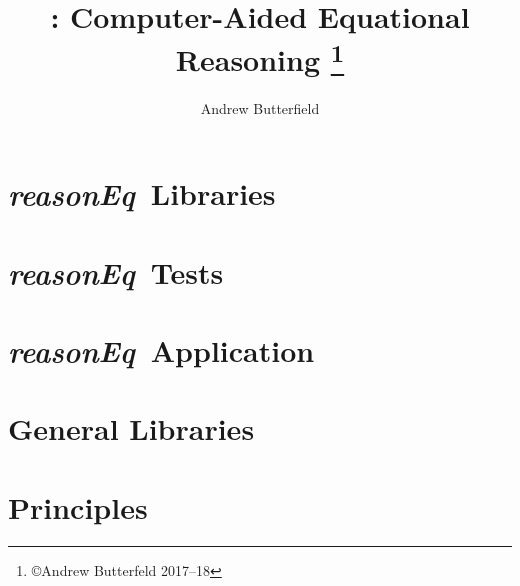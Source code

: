 \documentclass[fleqn,10pt]{report}
\author{Andrew Butterfield}
\title{
  \reasonEq: Computer-Aided Equational Reasoning%
  \thanks{\copyright Andrew Butterfeld 2017--18}
}
\def\reasonEq{\textit{\textsf{reasonEq}}}
\begin{document}
\maketitle
\tableofcontents

\chapter{\reasonEq\ Libraries}

% 
% 
\newpage

% 
% 
\newpage

% 
% 

\chapter{\reasonEq\ Tests}

% 
\newpage


\chapter{\reasonEq\ Application}

% 

\chapter{General Libraries}

% 




\appendix

\chapter{Principles}

% 
\end{document}
